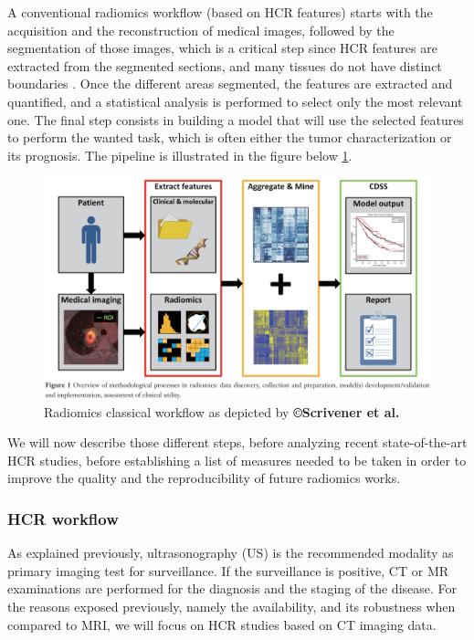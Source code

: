 \documentclass[]{article}
\begin{document}
A conventional radiomics workflow (based on HCR features) starts
with the acquisition and the reconstruction of medical images, followed
by the segmentation of those images, which is a critical step since
HCR features are extracted from the segmented sections, and many
tissues do not have distinct boundaries \cite{Gillies2016}. Once the different areas segmented, the features are
extracted and quantified, and a statistical analysis is performed to
select only the most relevant one. The final step consists in building a
model that will use the selected features to perform the wanted task,
which is often either the tumor characterization or its prognosis. The
pipeline is illustrated in the figure below \ref{Scrivener2016_Fig1}.


\begin{figure}[th!]
\centering
\includegraphics[width=0.7\linewidth]{images/image4}
\caption{Radiomics classical workflow as depicted by \textbf{©Scrivener et al.} \cite{Scrivener2016}}
\label{Scrivener2016_Fig1}
\end{figure}


We will now describe those different steps, before analyzing recent
state-of-the-art HCR studies, before establishing a list of
measures needed to be taken in order to improve the quality and the
reproducibility of future radiomics works.

\subsubsection*{HCR workflow}\label{hcr-workflow}

As explained previously, ultrasonography (US) is the recommended
modality as primary imaging test for surveillance. If the surveillance
is positive, CT or MR examinations are performed for the diagnosis and
the staging of the disease. For the reasons exposed previously, namely
the availability, and its robustness when compared to MRI, we will focus
on HCR studies based on CT imaging data.
\end{document}
